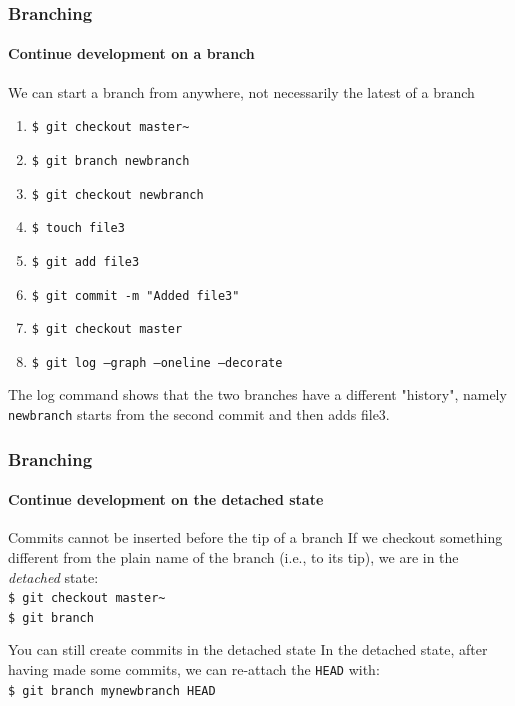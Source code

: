 \begin{frame}
\frametitle{Branching}
\framesubtitle{Continue development on a branch}

\begin{block}{We can start a branch from anywhere, not necessarily the latest of a branch}
\begin{enumerate}
\item \texttt{\$ git checkout master\textasciitilde{}} \\
\item \texttt{\$ git branch newbranch} \\
\item \texttt{\$ git checkout newbranch} \\
\item \texttt{\$ touch file3} \\
\item \texttt{\$ git add file3} \\
\item \texttt{\$ git commit -m "Added file3"} \\
\item \texttt{\$ git checkout master} \\
\item \texttt{\$ git log ---graph ---oneline ---decorate}
\end{enumerate}

The log command shows that the two branches have a different "history", namely \texttt{newbranch} starts from the second commit and then adds file3.
\end{block}
\end{frame}

\begin{frame}
\frametitle{Branching}
\framesubtitle{Continue development on the detached state}

\begin{block}{Commits cannot be inserted before the tip of a branch}
If we checkout something different from the plain name of the branch (i.e., to its tip), we are in the {\em detached} state: \\
\texttt{\$ git checkout master\textasciitilde{}} \\
\texttt{\$ git branch}
\end{block}
\pause
\begin{block}{You can still create commits in the detached state}
In the detached state, after having made some commits, we can re-attach the \texttt{HEAD} with: \\
\texttt{\$ git branch mynewbranch HEAD}
\end{block}

\end{frame}

